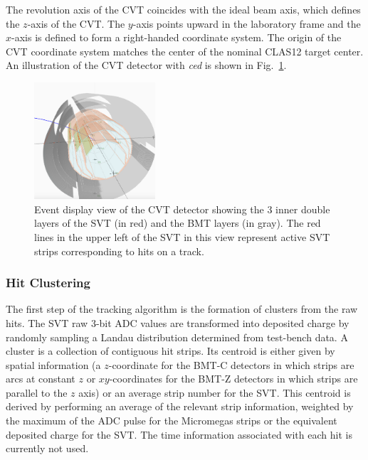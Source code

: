 The revolution axis of the CVT coincides with the ideal beam axis, which defines the $z$-axis of the CVT. The
$y$-axis points upward in the laboratory frame and the $x$-axis is defined to form a right-handed coordinate
system. The origin of the CVT coordinate system matches the center of the nominal CLAS12 target center. An
illustration of the CVT detector with {\it ced} is shown in Fig.~\ref{fig:cvt}.

\begin{figure}
\centering
\includegraphics[width=0.4\textwidth]{pics/cvt.png}
\caption{Event display view of the CVT detector showing the 3 inner double layers of the SVT (in red) and the
  BMT layers (in gray). The red lines in the upper left of the SVT in this view represent active SVT strips
  corresponding to hits on a track.}
\label{fig:cvt}
\end{figure}

\subsubsection{Hit Clustering}

The first step of the tracking algorithm is the formation of clusters from the raw hits. The SVT raw 3-bit ADC
values are transformed into deposited charge by randomly sampling a Landau distribution determined from
test-bench data. A cluster is a collection of contiguous hit strips. Its centroid is either given by spatial information
(a $z$-coordinate for the BMT-C detectors in which strips are arcs at constant $z$ or $xy$-coordinates for the
BMT-Z detectors in which strips are parallel to the $z$ axis) or an average strip number for the SVT. This centroid
is derived by performing an average of the relevant strip information, weighted by the maximum of the ADC pulse for
the Micromegas strips or the equivalent deposited charge for the SVT. The time information associated with each hit
is currently not used.

